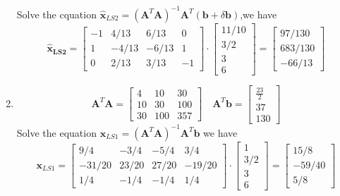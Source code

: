 \documentclass[english,onecolumn]{IEEEtran}
\begin{document}
\begin{enumerate}
	
	Solve the cquation $\hat{\mathbf{x}}_{L S2}=\left(\mathbf{A}^{T} \mathbf{A}\right)^{-1} \mathbf{A}^{T}(\mathbf{b}+\delta \mathbf{b})$,we have
$$
\hat{\mathbf{x}}_{\mathbf{L S2}}=\left[\begin{array}{cccc}
	-1 & 4 / 13 & 6 / 13 & 0 \\
	1 & -4 / 13 & -6 / 13 & 1 \\
	0 & 2 / 13 & 3 / 13 & -1
\end{array}\right] \cdot\left[\begin{array}{c}
	11 / 10 \\
	3 / 2 \\
	3 \\
	6
\end{array}\right]=\left[\begin{array}{c}
	97 / 130 \\
	683 / 130 \\
	-66 / 13
\end{array}\right]
$$
	\item
	$$
	\mathbf{A}^{T} \mathbf{A}=\left[\begin{array}{ccc}
		4 & 10 & 30 \\
		10 & 30 & 100 \\
		30 & 100 & 357
	\end{array}\right] \quad \mathbf{A}^{T} \mathbf{b}=\left[\begin{array}{c}
		\frac{23}{2} \\
		37 \\
		130
	\end{array}\right]
	$$
	Solve the equation $\mathbf{x}_{LS1}=\left(\mathbf{A}^{T} \mathbf{A}\right)^{-1} \mathbf{A}^{T} \mathbf{b}$ we have
	$$
	\mathbf{x}_{L S1}=\left[\begin{array}{cccc}
		9 / 4 & -3 / 4 & -5 / 4 & 3 / 4 \\
		-31 / 20 & 23 / 20 & 27 / 20 & -19 / 20 \\
		1 / 4 & -1 / 4 & -1 / 4 & 1 / 4
	\end{array}\right] \cdot\left[\begin{array}{c}
		1 \\
		3 / 2 \\
		3 \\
		6
	\end{array}\right]=\left[\begin{array}{c}
		15 / 8 \\
		-59 / 40 \\
		5 / 8
	\end{array}\right]
	$$
	

\end{enumerate}
\end{document}

